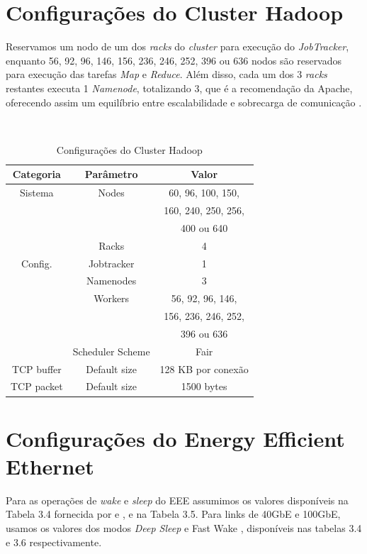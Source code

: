 \section{Configurações do Cluster Hadoop}

Reservamos um nodo de um dos \emph{racks} do \emph{cluster} para execução do \emph{JobTracker}, enquanto 56, 92, 96, 146, 156, 236, 246, 252, 396 ou 636 nodos são reservados para execução das tarefas \emph{Map} e \emph{Reduce}. Além disso, cada um dos 3 \emph{racks} restantes executa 1 \emph{Namenode}, totalizando 3, que é a recomendação da Apache, oferecendo assim um equilíbrio entre escalabilidade e sobrecarga de comunicação \cite{HDFSHighAvailability}.

\begin{table}[!htp]~
\centering
\caption{Configurações do Cluster Hadoop}
\label{Simulation_Environment}
\def\arraystretch{1.2}
\begin{tabular}{c c c}
\hline
Categoria & Parâmetro & Valor \\
\hline
Sistema & Nodes & 60, 96, 100, 150,\\
 & & 160, 240, 250, 256,\\
 & & 400 ou 640\\
 & Racks & 4\\
Config. & Jobtracker & 1\\
 & Namenodes & 3\\
 & Workers & 56, 92, 96, 146,\\
 & & 156, 236, 246, 252,\\
 & & 396 ou 636\\
 & Scheduler Scheme & Fair\\
TCP buffer & Default size & 128 KB por conexão\\
TCP packet & Default size & 1500 bytes\\
\hline
\end{tabular}
\end{table}


\section{Configurações do Energy Efficient Ethernet}


Para as operações de \emph{wake} e \emph{sleep} do EEE assumimos os valores disponíveis na Tabela 3.4 fornecida por \cite{reviriego2009performance} e \cite{6891095}, e na Tabela 3.5. Para links de 40GbE e 100GbE, usamos os valores dos modos \emph{Deep Sleep} e {Fast Wake} \cite {6891095}, disponíveis nas tabelas 3.4 e 3.6 respectivamente.

